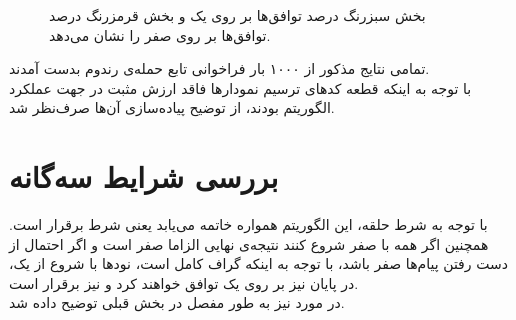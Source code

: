 \documentclass{article}
\begin{document}
\begin{multicols}{2}
\begin{figure}[H]
    \caption{
    بخش سبزرنگ درصد توافق‌ها بر روی یک و بخش قرمزرنگ درصد توافق‌ها بر روی صفر را نشان می‌دهد.
    }
    \label{fig:my_label}
\end{figure}
تمامی نتایج مذکور از ۱۰۰۰ بار فراخوانی تابع حمله‌ی رندوم بدست آمدند.\\
با توجه به اینکه قطعه کدهای ترسیم نمودارها فاقد ارزش مثبت در جهت عملکرد الگوریتم بودند، از توضیح پیاده‌سازی آن‌ها صرف‌نظر شد.
\section*{بررسی شرایط سه‌گانه}
با توجه به شرط حلقه، این الگوریتم همواره خاتمه می‌یابد یعنی شرط
برقرار است. همچنین اگر همه با صفر شروع کنند نتیجه‌ی نهایی الزاما صفر است و اگر احتمال از دست رفتن پیام‌ها صفر باشد، با توجه به اینکه گراف کامل است، نودها با شروع از یک، در پایان نیز بر روی یک توافق خواهند کرد و
نیز برقرار است.\\
در مورد
نیز به طور مفصل در بخش قبلی توضیح داده شد.
\end{multicols}
\end{document}
